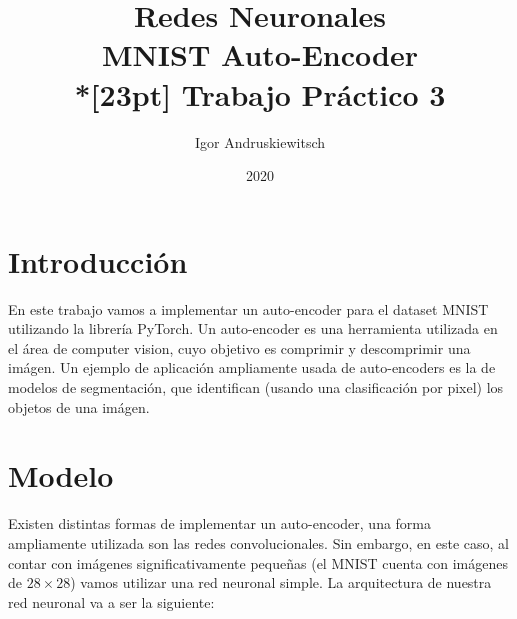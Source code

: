 \documentclass[a4paper,12pt,oneside,final]{article}
\title{%
Redes Neuronales \\
MNIST Auto-Encoder \\*[23pt]
Trabajo Práctico 3 \\
}
\date{2020}
\author{Igor Andruskiewitsch}
\begin{document}
    \maketitle

\section{Introducción}

En este trabajo vamos a implementar un auto-encoder para el dataset MNIST utilizando la librería PyTorch. Un auto-encoder es una herramienta utilizada en el área de computer vision, cuyo objetivo es comprimir y descomprimir una imágen. Un ejemplo de aplicación ampliamente usada de auto-encoders es la de modelos de segmentación, que identifican (usando una clasificación por pixel) los objetos de una imágen.

\section{Modelo}

Existen distintas formas de implementar un auto-encoder, una forma ampliamente utilizada son las redes convolucionales. Sin embargo, en este caso, al contar con imágenes significativamente pequeñas (el MNIST cuenta con imágenes de $28 \times 28$) vamos utilizar una red neuronal simple. La arquitectura de nuestra red neuronal va a ser la siguiente:
\end{document}
